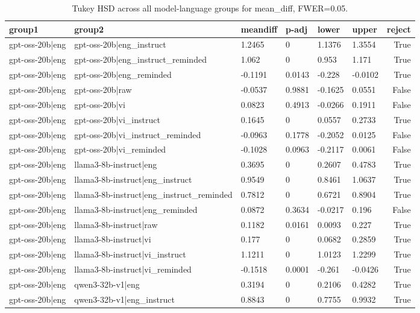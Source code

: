 \begin{table}
\caption{Tukey HSD across all model-language groups for mean_diff, FWER=0.05.}
\label{tab:tukey_all_models_all_langs_mean_diff}
\begin{tabular}{llllllr}
\toprule
group1 & group2 & meandiff & p-adj & lower & upper & reject \\
\midrule
gpt-oss-20b|eng & gpt-oss-20b|eng_instruct & 1.2465 & 0 & 1.1376 & 1.3554 & True \\
gpt-oss-20b|eng & gpt-oss-20b|eng_instruct_reminded & 1.062 & 0 & 0.953 & 1.171 & True \\
gpt-oss-20b|eng & gpt-oss-20b|eng_reminded & -0.1191 & 0.0143 & -0.228 & -0.0102 & True \\
gpt-oss-20b|eng & gpt-oss-20b|raw & -0.0537 & 0.9881 & -0.1625 & 0.0551 & False \\
gpt-oss-20b|eng & gpt-oss-20b|vi & 0.0823 & 0.4913 & -0.0266 & 0.1911 & False \\
gpt-oss-20b|eng & gpt-oss-20b|vi_instruct & 0.1645 & 0 & 0.0557 & 0.2733 & True \\
gpt-oss-20b|eng & gpt-oss-20b|vi_instruct_reminded & -0.0963 & 0.1778 & -0.2052 & 0.0125 & False \\
gpt-oss-20b|eng & gpt-oss-20b|vi_reminded & -0.1028 & 0.0963 & -0.2117 & 0.0061 & False \\
gpt-oss-20b|eng & llama3-8b-instruct|eng & 0.3695 & 0 & 0.2607 & 0.4783 & True \\
gpt-oss-20b|eng & llama3-8b-instruct|eng_instruct & 0.9549 & 0 & 0.8461 & 1.0637 & True \\
gpt-oss-20b|eng & llama3-8b-instruct|eng_instruct_reminded & 0.7812 & 0 & 0.6721 & 0.8904 & True \\
gpt-oss-20b|eng & llama3-8b-instruct|eng_reminded & 0.0872 & 0.3634 & -0.0217 & 0.196 & False \\
gpt-oss-20b|eng & llama3-8b-instruct|raw & 0.1182 & 0.0161 & 0.0093 & 0.227 & True \\
gpt-oss-20b|eng & llama3-8b-instruct|vi & 0.177 & 0 & 0.0682 & 0.2859 & True \\
gpt-oss-20b|eng & llama3-8b-instruct|vi_instruct & 1.1211 & 0 & 1.0123 & 1.2299 & True \\
gpt-oss-20b|eng & llama3-8b-instruct|vi_reminded & -0.1518 & 0.0001 & -0.261 & -0.0426 & True \\
gpt-oss-20b|eng & qwen3-32b-v1|eng & 0.3194 & 0 & 0.2106 & 0.4282 & True \\
gpt-oss-20b|eng & qwen3-32b-v1|eng_instruct & 0.8843 & 0 & 0.7755 & 0.9932 & True \\

\end{tabular}
\end{table}
